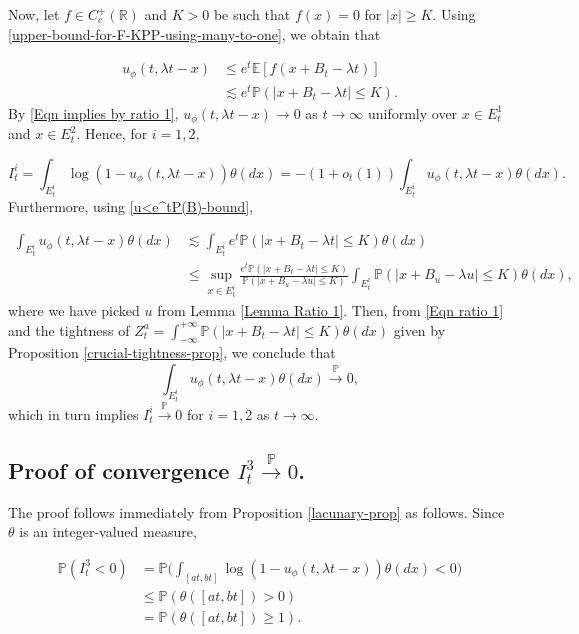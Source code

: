\documentclass[a4paper,reqno]{amsart}%
\newcommand{\1}{\mathbf 1}
\theoremstyle{mine}
\numberwithin{theorem}{section}
\numberwithin{equation}{section}
\theoremstyle{remark}
\begin{document}
Now, let $f\in C_c^+(\mathbb{R})$ and $K>0$ be such that $f(x) =0$ for $|x| \geq K$. Using \eqref{upper-bound-for-F-KPP-using-many-to-one}, we obtain that 

\begin{align}
    \nonumber u_\phi(t, \lambda t -x) &\leq  e^t \mathbb{E}[f(x+ B_t - \lambda t)] \\
     & \lesssim e^t \mathbb{P}(|x+ B_t - \lambda t| \leq K). \label{u<e^tP(B)-bound}
\end{align}
By \eqref{Eqn implies by ratio 1}, $u_\phi(t, \lambda t -x) \to 0 $ as $t\to \infty$ uniformly over $x\in E_t^1$ and $x\in E_t^2$. Hence, for $i=1,2$, 

\begin{equation}
    I_t^i =  \int_{E_t^i}\log(1- u_\phi(t, \lambda t -x))\theta(dx) = -(1+ o_t(1)) \int_{E_t^i}u_\phi(t, \lambda t -x)\theta(dx).
\end{equation}
Furthermore, using \eqref{u<e^tP(B)-bound}, 

\begin{align}
    \label{final-step-for-i=1,2} \int_{E_t^i}u_\phi(t, \lambda t -x)\theta(dx) &\lesssim \int_{E_t^i}e^t \mathbb{P}(|x+ B_t - \lambda t| \leq K) \theta(dx) \\
     \nonumber &\leq \sup_{x\in E_t^i} \frac{e^t \mathbb{P}(|x+ B_t - \lambda t| \leq K)}{\mathbb{P}(|x+ B_u - \lambda u| \leq K)} \int_{E_t^i}\mathbb{P}(|x+ B_u - \lambda u| \leq K) \theta(dx),
\end{align}
where we have picked $u$ from Lemma \ref{Lemma Ratio 1}. Then, from \eqref{Eqn ratio 1} and the tightness of $Z_t^a = \int_{-\infty}^{+\infty} \mathbb{P}(|x + B_t - \lambda t| \leq K) \theta(dx)$ given by Proposition \ref{crucial-tightness-prop}, we conclude that 
\[ \int_{E_t^i}u_\phi(t, \lambda t -x)\theta(dx) \overset{\mathbb{P}}{\to} 0,\]
which in turn implies $I_t^i \overset{\mathbb{P}}{\to} 0$ for $i=1,2$ as $t \to \infty$. 


\subsection{Proof of convergence $I_t^3 \overset{\mathbb{P}}{\to} 0$.}

The proof follows immediately from Proposition \ref{lacunary-prop} as follows. Since $\theta$ is an integer-valued measure, 

\begin{align}
    \nonumber\mathbb{P}(I_t^3<0) &= \mathbb{P}\biggl( \int_{[at,bt]}\log(1- u_\phi(t, \lambda t -x))\theta(dx) <0\biggr) \\
    \nonumber &\leq \mathbb{P}(\theta([at, bt]) >0) \\
    \nonumber &= \mathbb{P}(\theta([at, bt]) \geq 1).
\end{align}
\end{document}
